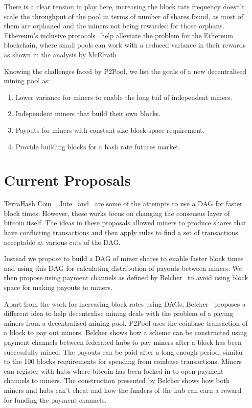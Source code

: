 \documentclass{article}
\begin{document}
There is a clear tension in play here, increasing the block rate
frequency doesn't scale the throughput of the pool in terms of number
of shares found, as most of them are orphaned and the miners not being
rewarded for those orphans. Ethereum's inclusive
protocols~\cite{inclusive-protocols} help alleviate the problem for
the Ethereum blockchain, where small pools can work with a reduced
variance in their rewards as shown in the analysis by
McElrath~\cite{mcelrath:variance}.

Knowing the challenges faced by P2Pool, we list the goals of a new
decentralised mining pool as:

\begin{enumerate}
  \item Lower variance for miners to enable the long tail of independent miners.
  \item Independent miners that build their own blocks.
  \item Payouts for miners with constant size block space requirement.
  \item Provide building blocks for a hash rate futures market.
\end{enumerate}

\section{Current Proposals}

TerraHash Coin~\cite{mcelrath:variance}, Jute~\cite{jute}
and~\cite{spectre} are some of the attempts to use a DAG for faster
block times. However, these works focus on changing the consensus
layer of bitcoin itself. The ideas in these proposals allowed miners
to produce shares that have conflicting transactions and then apply
rules to find a set of transactions acceptable at various cuts of the
DAG.\@

Instead we propose to build a DAG of miner shares to enable faster
block times and using this DAG for calculating distribution of payouts
between miners. We then propose using payment channels as defined by
Belcher~\cite{channels-for-rewards} to avoid using block space for
making payouts to miners.

Apart from the work for increasing block rates using DAGs,
Belcher~\cite{channels-for-rewards} proposes a different idea to help
decentralise mining deals with the problem of a paying miners from a
decentralised mining pool. P2Pool uses the coinbase transaction of a
block to pay out miners. Belcher shows how a scheme can be constructed
using payment channels between federated hubs to pay miners after a
block has been successfully mined. The payouts can be paid after a
long enough period, similar to the 100 blocks requirements for
spending from coinbase transactions. Miners can register with hubs
where bitcoin has been locked in to open payment channels to
miners. The construction presented by Belcher shows how both miners
and hubs can't cheat and how the funders of the hub can earn a reward
for funding the payment channels.
\end{document}
